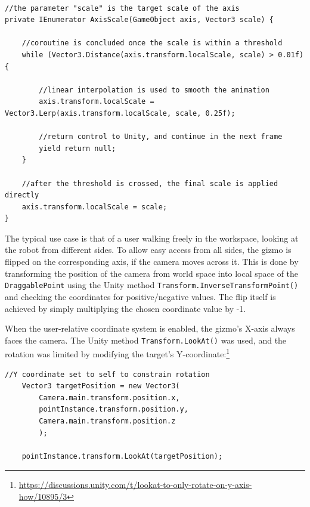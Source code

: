 \begin{lstlisting}[style=sharpc, breaklines=true]

//the parameter "scale" is the target scale of the axis
private IEnumerator AxisScale(GameObject axis, Vector3 scale) {

    //coroutine is concluded once the scale is within a threshold
    while (Vector3.Distance(axis.transform.localScale, scale) > 0.01f) {
    
        //linear interpolation is used to smooth the animation
        axis.transform.localScale = Vector3.Lerp(axis.transform.localScale, scale, 0.25f);

        //return control to Unity, and continue in the next frame
        yield return null;
    }

    //after the threshold is crossed, the final scale is applied directly
    axis.transform.localScale = scale;
}
\end{lstlisting}


The typical use case is that of a user walking freely in the workspace, looking at the robot from different sides. To allow easy access from all sides, the gizmo is flipped on the corresponding axis, if the camera moves across it. This is done by transforming the position of the camera from world space into local space of the \texttt{DraggablePoint} using the Unity method \texttt{Transform.InverseTransformPoint()} and checking the coordinates for positive/negative values. The flip itself is achieved by simply multiplying the chosen coordinate value by -1.

When the user-relative coordinate system is enabled, the gizmo's X-axis always faces the camera. The Unity method \texttt{Transform.LookAt()} was used, and the rotation was limited by modifying the target's Y-coordinate:\footnote{\href{https://discussions.unity.com/t/lookat-to-only-rotate-on-y-axis-how/10895/3}{https://discussions.unity.com/t/lookat-to-only-rotate-on-y-axis-how/10895/3}}

\begin{lstlisting}[style=sharpc, breaklines=true]
    //Y coordinate set to self to constrain rotation
    Vector3 targetPosition = new Vector3(
        Camera.main.transform.position.x,
        pointInstance.transform.position.y,
        Camera.main.transform.position.z
        );
        
    pointInstance.transform.LookAt(targetPosition);

\end{lstlisting}

